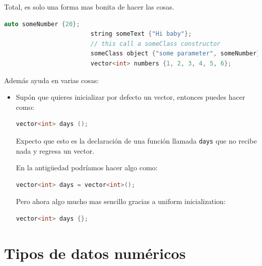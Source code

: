 \documentclass[12pt, fleqn]{report}                             %
\theoremstyle{break}                                            %
\newcommand{\textCode}[1]  { \texttt{#1} }                      %
\begin{document}
                    Total, es solo una forma mas bonita de hacer las cosas.
                    \begin{lstlisting}[language=C++, gobble=24]
                        auto someNumber {20};   
                        string someText {"Hi baby"};
                        // this call a someClass constructor
                        someClass object {"some parameter", someNumber};
                        vector<int> numbers {1, 2, 3, 4, 5, 6};
                    \end{lstlisting}

                    Además ayuda en varias cosas:
                    \begin{itemize}
                        \item 
                            Supón que quieres inicializar por defecto un vector, entonces puedes hacer como:
                            \begin{lstlisting}[language=C++, gobble=32]
                                vector<int> days ();   
                            \end{lstlisting}

                            Expecto que esto es la declaración de una función llamada \textCode{days} que no 
                            recibe nada y regresa un vector.

                            En la antigüedad podríamos hacer algo como:
                            \begin{lstlisting}[language=C++, gobble=32]
                                vector<int> days = vector<int>();   
                            \end{lstlisting}

                            Pero ahora algo mucho mas sencillo gracias a uniform inicialization:
                            \begin{lstlisting}[language=C++, gobble=32]
                                vector<int> days {};   
                            \end{lstlisting}

                    \end{itemize}

        \clearpage
        \section{Tipos de datos numéricos}
\end{document}
